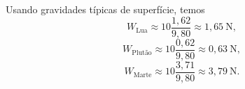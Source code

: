 Usando gravidades típicas de superfície, temos
\[
W_{\text{Lua}}\approx10\frac{1{,}62}{9{,}80}\approx1{,}65\ \mathrm{N},
\]
\[
W_{\text{Plutão}}\approx10\frac{0{,}62}{9{,}80}\approx0{,}63\ \mathrm{N},
\]
\[
W_{\text{Marte}}\approx10\frac{3{,}71}{9{,}80}\approx3{,}79\ \mathrm{N}.
\]